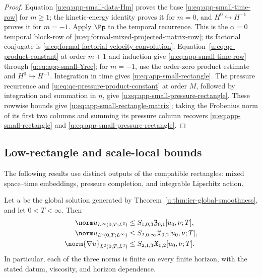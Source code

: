 \begin{proof}
Equation \eqref{u:eq:app-small-data-Hm} proves the base
\eqref{u:eq:app-small-time-row} for \(m\ge1\); the kinetic-energy identity
proves it for \(m=0\), and \(H^0\hookrightarrow H^{-1}\) proves it for
\(m=-1\).  Apply \(\Pp\) to the temporal recurrence.
This is the \(\alpha=0\) temporal block-row of
\eqref{u:eq:formal-mixed-projected-matrix-row}; its factorial conjugate is
\eqref{u:eq:formal-factorial-velocity-convolution}.
Equation~\eqref{u:eq:qc-product-constant} at order \(m+1\) and induction give
\eqref{u:eq:app-small-time-row} through
\eqref{u:eq:app-small-Yrec}; for \(m=-1\), use the order-zero product
estimate and \(H^0\hookrightarrow H^{-1}\).  Integration in time gives
\eqref{u:eq:app-small-rectangle}.  The pressure recurrence and
\eqref{u:eq:qc-pressure-product-constant} at order \(M\), followed by
integration and summation in \(n\), give
\eqref{u:eq:app-small-pressure-rectangle}.  These rowwise bounds give
\eqref{u:eq:app-small-rectangle-matrix}; taking the Frobenius norm of its first
two columns and summing its pressure column recovers
\eqref{u:eq:app-small-rectangle} and
\eqref{u:eq:app-small-pressure-rectangle}.
\end{proof}

\subsection{Low-rectangle and scale-local bounds}

The following results use distinct outputs of the compatible rectangles:
mixed space--time embeddings, pressure completion, and integrable Lipschitz
action.

\begin{proposition}
\label{u:prop:app-low-rectangle-classes}
Let \(u\) be the global solution generated by
Theorem~\ref{u:thm:ier-global-smoothness}, and let \(0<T<\infty\).  Then
\begin{align}
 \norm u_{L^\infty(0,T;L^3)}
 &\le S_{1,0,3}\mathfrak Z_{0,1}[u_0,\nu;T],
 \label{u:eq:app-LinfL3}\\
 \norm u_{L^2(0,T;L^\infty)}
 &\le S_{2,0,\infty}\mathfrak X_{0,2}[u_0,\nu;T],
 \label{u:eq:app-L2Linfty}\\
 \norm{\nabla u}_{L^2(0,T;L^3)}
 &\le S_{2,1,3}\mathfrak X_{0,2}[u_0,\nu;T].
 \label{u:eq:app-grad-L2L3}
\end{align}
In particular, each of the three norms is finite on every finite horizon,
with the stated datum, viscosity, and horizon dependence.
\end{proposition}

